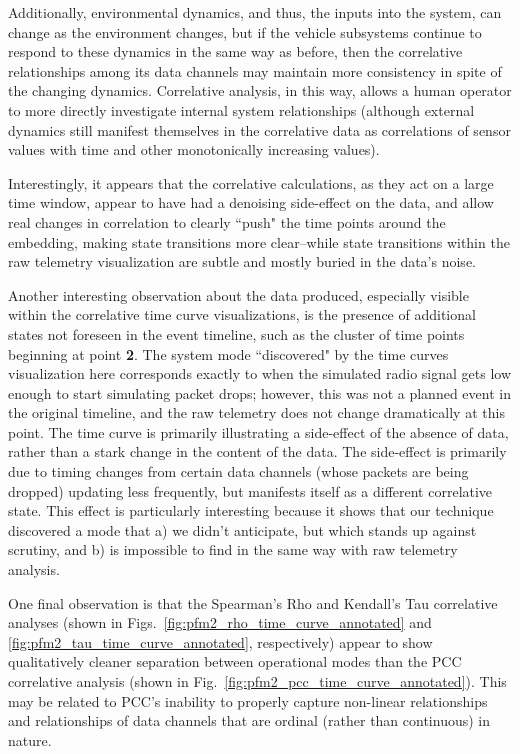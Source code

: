 Additionally, environmental dynamics, and thus, the inputs into the system, can change as the environment changes, but if the vehicle subsystems continue to respond to these dynamics in the same way as before, then the correlative relationships among its data channels may maintain more consistency in spite of the changing dynamics. Correlative analysis, in this way, allows a human operator to more directly investigate internal system relationships (although external dynamics still manifest themselves in the correlative data as correlations of sensor values with time and other monotonically increasing values).

Interestingly, it appears that the correlative calculations, as they act on a large time window, appear to have had a denoising side-effect on the data, and allow real changes in correlation to clearly ``push" the time points around the embedding, making state transitions more clear--while state transitions within the raw telemetry visualization are subtle and mostly buried in the data's noise.

Another interesting observation about the data produced, especially visible within the correlative time curve visualizations, is the presence of additional states not foreseen in the event timeline, such as the cluster of time points beginning at point \textbf{2}. The system mode ``discovered" by the time curves visualization here corresponds exactly to when the simulated radio signal gets low enough to start simulating packet drops; however, this was not a planned event in the original timeline, and the raw telemetry does not change dramatically at this point.  The time curve is primarily illustrating a side-effect of the absence of data, rather than a stark change in the content of the data. The side-effect is primarily due to timing changes from certain data channels (whose packets are being dropped) updating less frequently, but manifests itself as a different correlative state. This effect is particularly interesting because it shows that our technique discovered a mode that a) we didn't anticipate, but which stands up against scrutiny, and b) is impossible to find in the same way with raw telemetry analysis.

One final observation is that the Spearman's Rho and Kendall's Tau correlative analyses (shown in Figs.~\ref{fig:pfm2_rho_time_curve_annotated} and \ref{fig:pfm2_tau_time_curve_annotated}, respectively) appear to show qualitatively cleaner separation between operational modes than the PCC correlative analysis (shown in Fig.~\ref{fig:pfm2_pcc_time_curve_annotated}). This may be related to PCC's inability to properly capture non-linear relationships and relationships of data channels that are ordinal (rather than continuous) in nature.

